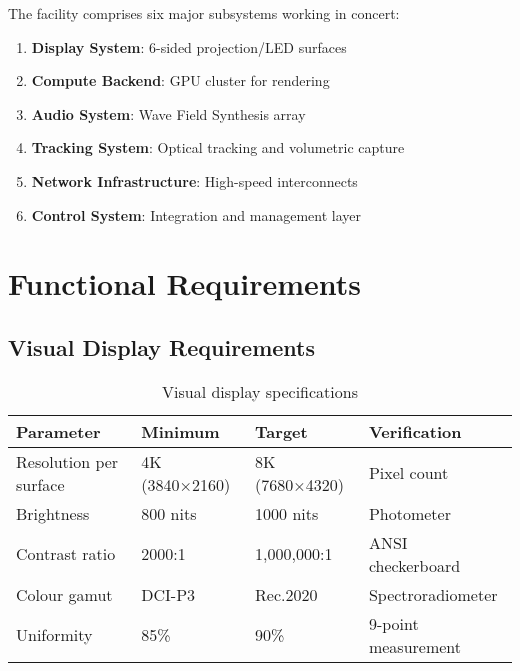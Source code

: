 The facility comprises six major subsystems working in concert:

\begin{enumerate}
    \item \textbf{Display System}: 6-sided projection/LED surfaces
    \item \textbf{Compute Backend}: GPU cluster for rendering
    \item \textbf{Audio System}: Wave Field Synthesis array
    \item \textbf{Tracking System}: Optical tracking and volumetric capture
    \item \textbf{Network Infrastructure}: High-speed interconnects
    \item \textbf{Control System}: Integration and management layer
\end{enumerate}

\section{Functional Requirements}

\subsection{Visual Display Requirements}






\begin{table}[H]
\centering
\begin{tabular}{@{}llll@{}}
\toprule
\textbf{Parameter} & \textbf{Minimum} & \textbf{Target} & \textbf{Verification} \\
\midrule
Resolution per surface & 4K (3840×2160) & 8K (7680×4320) & Pixel count \\
Brightness & 800 nits & 1000 nits & Photometer \\
Contrast ratio & 2000:1 & 1,000,000:1 & ANSI checkerboard \\
Colour gamut & DCI-P3 & Rec.2020 & Spectroradiometer \\
Uniformity & 85\% & 90\% & 9-point measurement \\
\bottomrule
\end{tabular}
\caption{Visual display specifications}
\end{table}


